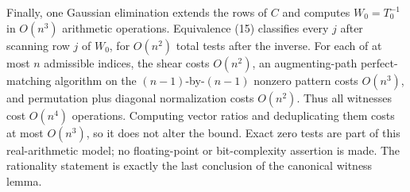 Finally, one Gaussian elimination extends the rows of \(C\) and computes \(W_0=T_0^{-1}\) in \(O(n^3)\) arithmetic operations. Equivalence (15) classifies every \(j\) after scanning row \(j\) of \(W_0\), for \(O(n^2)\) total tests after the inverse. For each of at most \(n\) admissible indices, the shear costs \(O(n^2)\), an augmenting-path perfect-matching algorithm on the \((n-1)\)-by-\((n-1)\) nonzero pattern costs \(O(n^3)\), and permutation plus diagonal normalization costs \(O(n^2)\). Thus all witnesses cost \(O(n^4)\) operations. Computing vector ratios and deduplicating them costs at most \(O(n^3)\), so it does not alter the bound. Exact zero tests are part of this real-arithmetic model; no floating-point or bit-complexity assertion is made. The rationality statement is exactly the last conclusion of the canonical witness lemma.